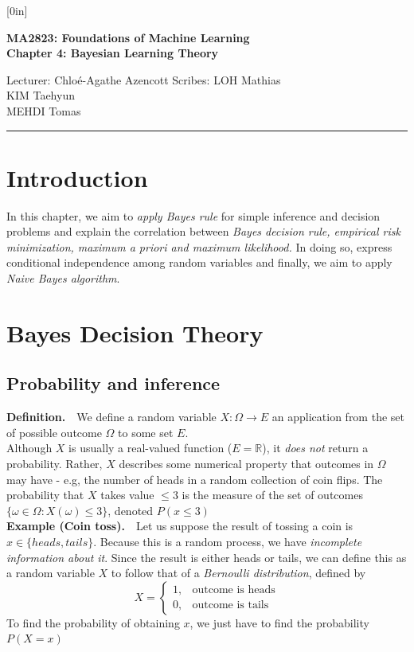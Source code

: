 \documentclass[a4paper,12pt]{article}
\begin{document}
\raisebox{0.6in}[0in]{}
\vspace{-0.7in}

\begin{center}
\bf\large MA2823: Foundations of Machine Learning \\
Chapter 4: Bayesian Learning Theory
\end{center}

\noindent
Lecturer: Chlo\'e-Agathe Azencott   
\hfill
Scribes: LOH Mathias \\
\null \hfill KIM Taehyun \\
\null \hfill MEHDI Tomas

\noindent
\rule{\textwidth}{1pt}

\medskip

\section{Introduction}
In this chapter, we aim to \textit{apply Bayes rule} for simple inference and decision problems and explain the correlation between \textit{Bayes decision rule, empirical risk minimization, maximum a priori and maximum likelihood.} In doing so, express conditional independence among random variables and finally, we aim to apply \textit{Naive Bayes algorithm}.
\section{Bayes Decision Theory}
\subsection{Probability and inference}
\textbf{Definition.}$\quad$We define a random variable $X: \Omega \rightarrow E$ an application from the set of possible outcome $\Omega$ to some set $E$. \\

Although $X$ is usually a real-valued function ($E=\mathbb{R}$), it \textit{does not} return a probability. Rather, $X$ describes some numerical property that outcomes in $\Omega$ may have - e.g, the number of heads in a random collection of coin flips. The probability that $X$ takes value $\leq 3$ is the measure of the set of outcomes $\{\omega \in \Omega : X(\omega) \leq 3\}$, denoted $P(x\leq3)$ \\ 

\textbf{Example (Coin toss).}$\quad$Let us suppose the result of tossing a coin is $x \in \{heads , tails\}$. Because this is a random process, we have \textit{incomplete information about it}. Since the result is either heads or tails, we can define this as a random variable $X$ to follow that of a \textit{Bernoulli distribution}, defined by 
\begin{equation*}
X = 
\begin{cases}
1, & \text{outcome is heads}\\
0, & \text{outcome is tails}
\end{cases}
\end{equation*}
To find the probability of obtaining $x$, we just have to find the probability $P(X=x)$ 
\end{document}

